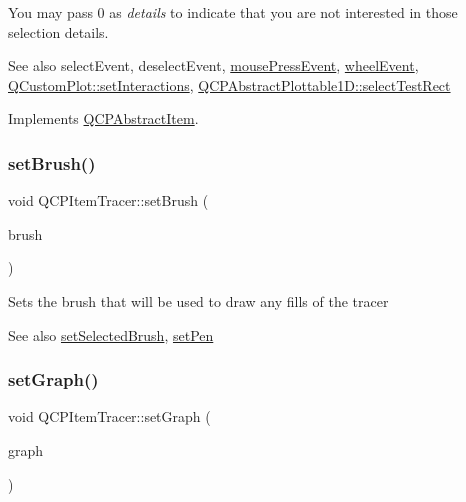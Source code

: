 You may pass 0 as {\itshape details} to indicate that you are not interested in those selection details.

\begin{DoxySeeAlso}{See also}
select\+Event, deselect\+Event, \hyperlink{classQCPLayerable_af6567604818db90f4fd52822f8bc8376}{mouse\+Press\+Event}, \hyperlink{classQCPLayerable_a47dfd7b8fd99c08ca54e09c362b6f022}{wheel\+Event}, \hyperlink{classQCustomPlot_a5ee1e2f6ae27419deca53e75907c27e5}{Q\+Custom\+Plot\+::set\+Interactions}, \hyperlink{classQCPAbstractPlottable1D_a22377bf6e57ab7eedbc9e489250c6ded}{Q\+C\+P\+Abstract\+Plottable1\+D\+::select\+Test\+Rect} 
\end{DoxySeeAlso}


Implements \hyperlink{classQCPAbstractItem_ae41d0349d68bb802c49104afd100ba2a}{Q\+C\+P\+Abstract\+Item}.

\mbox{\label{classQCPItemTracer_a2c303f7470a30084daa201ed556b3c36}} 
\subsubsection{\texorpdfstring{set\+Brush()}{setBrush()}}
{\footnotesize\ttfamily void Q\+C\+P\+Item\+Tracer\+::set\+Brush (\begin{DoxyParamCaption}\item[{const Q\+Brush \&}]{brush }\end{DoxyParamCaption})}

Sets the brush that will be used to draw any fills of the tracer

\begin{DoxySeeAlso}{See also}
\hyperlink{classQCPItemTracer_a0f55c084980a7a312af859d3e7b558ef}{set\+Selected\+Brush}, \hyperlink{classQCPItemTracer_af8048636fc1ef0152e51809b008df2ca}{set\+Pen} 
\end{DoxySeeAlso}
\mbox{\label{classQCPItemTracer_af5886f4ded8dd68cb4f3388f390790c0}} 
\subsubsection{\texorpdfstring{set\+Graph()}{setGraph()}}
{\footnotesize\ttfamily void Q\+C\+P\+Item\+Tracer\+::set\+Graph (\begin{DoxyParamCaption}\item[{\hyperlink{classQCPGraph}{Q\+C\+P\+Graph} $\ast$}]{graph }\end{DoxyParamCaption})}

